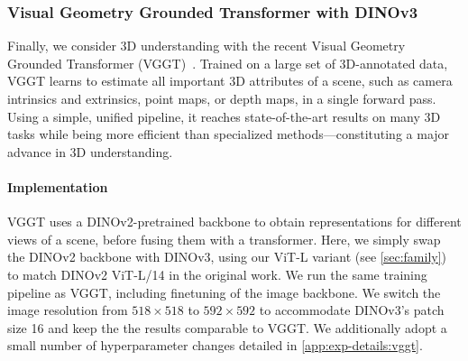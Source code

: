 \subsubsection{Visual Geometry Grounded Transformer with DINOv3}
\label{sec:results-vggt}

Finally, we consider 3D understanding with the recent Visual Geometry Grounded Transformer (VGGT)~\citep{wang2025vggt}.
Trained on a large set of 3D-annotated data, VGGT learns to estimate all important 3D attributes of a scene, such as camera intrinsics and extrinsics, point maps, or depth maps, in a single forward pass.
Using a simple, unified pipeline, it reaches state-of-the-art results on many 3D tasks while being more efficient than specialized methods---constituting a major advance in 3D understanding.

\paragraph{Implementation}
VGGT uses a DINOv2-pretrained backbone to obtain representations for different views of a scene, before fusing them with a transformer.
Here, we simply swap the DINOv2 backbone with DINOv3, using our ViT-L variant (see \cref{sec:family}) to match DINOv2 ViT-L/14 in the original work.
We run the same training pipeline as VGGT, including finetuning of the image backbone.
We switch the image resolution from $518 \times 518$ to $592 \times 592$ to accommodate DINOv3's patch size 16 and keep the the results comparable to VGGT. We additionally adopt a small number of hyperparameter changes detailed in \cref{app:exp-details:vggt}.

